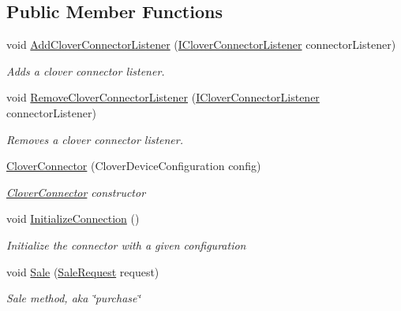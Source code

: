 \subsection*{Public Member Functions}
\begin{DoxyCompactItemize}
\item 
void \hyperlink{classcom_1_1clover_1_1remotepay_1_1sdk_1_1_clover_connector_aebd32d30edf2691cafd56d8540597d9a}{Add\+Clover\+Connector\+Listener} (\hyperlink{interfacecom_1_1clover_1_1remotepay_1_1sdk_1_1_i_clover_connector_listener}{I\+Clover\+Connector\+Listener} connector\+Listener)
\begin{DoxyCompactList}\small\item\em Adds a clover connector listener. \end{DoxyCompactList}\item 
void \hyperlink{classcom_1_1clover_1_1remotepay_1_1sdk_1_1_clover_connector_a05aa30b8a934164519333645e267c2e5}{Remove\+Clover\+Connector\+Listener} (\hyperlink{interfacecom_1_1clover_1_1remotepay_1_1sdk_1_1_i_clover_connector_listener}{I\+Clover\+Connector\+Listener} connector\+Listener)
\begin{DoxyCompactList}\small\item\em Removes a clover connector listener. \end{DoxyCompactList}\item 
\hyperlink{classcom_1_1clover_1_1remotepay_1_1sdk_1_1_clover_connector_acc9fab2e3c5832509009d8c40a8eefe8}{Clover\+Connector} (Clover\+Device\+Configuration config)
\begin{DoxyCompactList}\small\item\em \hyperlink{classcom_1_1clover_1_1remotepay_1_1sdk_1_1_clover_connector}{Clover\+Connector} constructor \end{DoxyCompactList}\item 
void \hyperlink{classcom_1_1clover_1_1remotepay_1_1sdk_1_1_clover_connector_ae103900f25165ad063e914698e0aeb5d}{Initialize\+Connection} ()
\begin{DoxyCompactList}\small\item\em Initialize the connector with a given configuration \end{DoxyCompactList}\item 
void \hyperlink{classcom_1_1clover_1_1remotepay_1_1sdk_1_1_clover_connector_a1adbcc8a0d4aaa82157a102af4f16b91}{Sale} (\hyperlink{classcom_1_1clover_1_1remotepay_1_1sdk_1_1_sale_request}{Sale\+Request} request)
\begin{DoxyCompactList}\small\item\em Sale method, aka \char`\"{}purchase\char`\"{} \end{DoxyCompactList}\item 

\end{DoxyCompactItemize}
